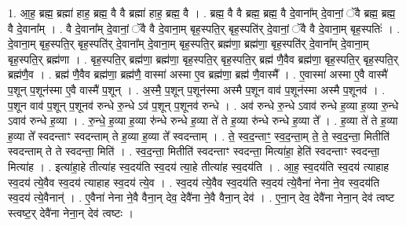 \documentclass[17pt]{extarticle}
\begin{document}
1. आ॒ह॒ ब्रह्म॒ ब्रह्मा॑ हाह॒ ब्रह्म॒ वै वै ब्रह्मा॑ हाह॒ ब्रह्म॒ वै । . ब्रह्म॒ वै वै ब्रह्म॒ ब्रह्म॒ वै दे॒वाना᳚म् दे॒वानां॒ ॅवै ब्रह्म॒ ब्रह्म॒ वै दे॒वाना᳚म् । . वै दे॒वाना᳚म् दे॒वानां॒ ॅवै वै दे॒वाना॒म् बृह॒स्पति॒र् बृह॒स्पति॑र् दे॒वानां॒ ॅवै वै दे॒वाना॒म् बृह॒स्पतिः॑ । . दे॒वाना॒म् बृह॒स्पति॒र् बृह॒स्पति॑र् दे॒वाना᳚म् दे॒वाना॒म् बृह॒स्पति॒र् ब्रह्म॑णा॒ ब्रह्म॑णा॒ बृह॒स्पति॑र् दे॒वाना᳚म् दे॒वाना॒म् बृह॒स्पति॒र् ब्रह्म॑णा । . बृह॒स्पति॒र् ब्रह्म॑णा॒ ब्रह्म॑णा॒ बृह॒स्पति॒र् बृह॒स्पति॒र् ब्रह्म॑ णै॒वैव ब्रह्म॑णा॒ बृह॒स्पति॒र् बृह॒स्पति॒र् ब्रह्म॑णै॒व । . ब्रह्म॑ णै॒वैव ब्रह्म॑णा॒ ब्रह्म॑णै॒ वास्मा॑ अस्मा ए॒व ब्रह्म॑णा॒ ब्रह्म॑ णै॒वास्मै᳚ । . ए॒वास्मा॑ अस्मा ए॒वै वास्मै॑ प॒शून् प॒शून॑स्मा ए॒वै वास्मै॑ प॒शून् । . अ॒स्मै॒ प॒शून् प॒शून॑स्मा अस्मै प॒शून वाव॑ प॒शून॑स्मा अस्मै प॒शूनव॑ । . प॒शून वाव॑ प॒शून् प॒शूनव॑ रुन्धे रु॒न्धे ऽव॑ प॒शून् प॒शूनव॑ रुन्धे । . अव॑ रुन्धे रु॒न्धे ऽवाव॑ रुन्धे ह॒व्या ह॒व्या रु॒न्धे ऽवाव॑ रुन्धे ह॒व्या । . रु॒न्धे॒ ह॒व्या ह॒व्या रु॑न्धे रुन्धे ह॒व्या ते॑ ते ह॒व्या रु॑न्धे रुन्धे ह॒व्या ते᳚ । . ह॒व्या ते॑ ते ह॒व्या ह॒व्या ते᳚ स्वदन्ताꣳ स्वदन्ताम् ते ह॒व्या ह॒व्या ते᳚ स्वदन्ताम् । . ते॒ स्व॒द॒न्ताꣳ॒॒ स्व॒द॒न्ता॒म् ते॒ ते॒ स्व॒द॒न्ता॒ मितीति॑ स्वदन्ताम् ते ते स्वदन्ता॒ मिति॑ । . स्व॒द॒न्ता॒ मितीति॑ स्वदन्ताꣳ स्वदन्ता॒ मित्या॑हा॒ हेति॑ स्वदन्ताꣳ स्वदन्ता॒ मित्या॑ह । . इत्या॑हा॒हे तीत्या॑ह स्व॒दय॑ति स्व॒दय॑ त्या॒हे तीत्या॑ह स्व॒दय॑ति । . आ॒ह॒ स्व॒दय॑ति स्व॒दय॑ त्याहाह स्व॒दय॑ त्ये॒वैव स्व॒दय॑ त्याहाह स्व॒दय॑ त्ये॒व । . स्व॒दय॑ त्ये॒वैव स्व॒दय॑ति स्व॒दय॑ त्ये॒वैना॑ नेना ने॒व स्व॒दय॑ति स्व॒दय॑ त्ये॒वैनान्॑ । . ए॒वैना॑ नेना ने॒वै वैना॒न् देव॒ देवै॑ना ने॒वै वैना॒न् देव॑ । . ए॒ना॒न् देव॒ देवै॑ना नेना॒न् देव॑ त्वष्ट स्त्वष्ट॒र् देवै॑ना नेना॒न् देव॑ त्वष्टः । \newline
\end{document}
